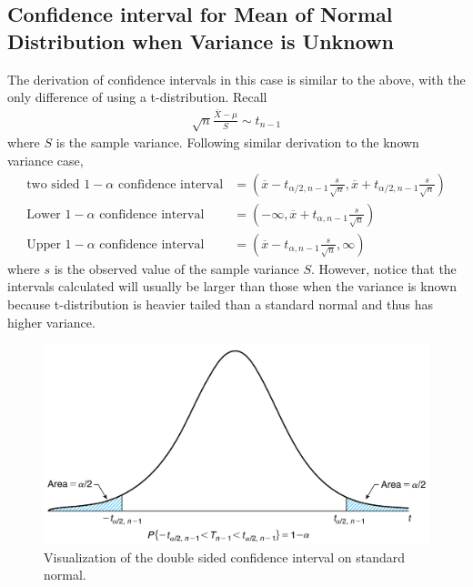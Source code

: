 \documentclass[../probability-notes.tex]{subfiles}
\begin{document}
    \subsection{Confidence interval for Mean of Normal Distribution when Variance is Unknown}
    The derivation of confidence intervals in this case is similar to the above, with the only difference of using a t-distribution. Recall
    \begin{align*}
        \sqrt{n} \frac{\overline{X} - \mu}{S} \sim t_{n-1}
    \end{align*}
    where $S$ is the sample variance. Following similar derivation to the known variance case,
    \begin{align*}
        \text{two sided $1 - \alpha$ confidence interval} &= (\overline{x}-t_{\alpha /2, n-1}\frac{s}{\sqrt{n}}, \overline{x}+t_{\alpha /2, n-1}\frac{s}{\sqrt{n}})\\
        \text{Lower $1-\alpha$ confidence interval} &= (-\infty, \overline{x} + t_{\alpha, n-1}\frac{s}{\sqrt{n}})\\
        \text{Upper $1-\alpha$ confidence interval} &= (\overline{x} - t_{\alpha, n-1}\frac{s}{\sqrt{n}}, \infty)
    \end{align*}
    where $s$ is the observed value of the sample variance $S$. However, notice that the intervals calculated will usually be larger than those when the variance is known because t-distribution is heavier tailed than a standard normal and thus has higher variance.

    \begin{figure}[h]
    \includegraphics[scale=0.3]{../images/conf_2}
    \centering
    \caption{Visualization of the double sided confidence interval on standard normal.}
    \label{fig:conf_2} %
    \end{figure}
\end{document}
